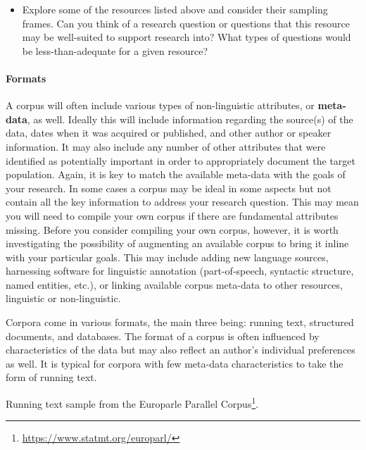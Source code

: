 \documentclass[
]{article}
\DeclareRobustCommand{\href}[2]{#2\footnote{\url{#1}}}
\newenvironment{rmdblock}[1]
  {\begin{shaded*}
  \begin{itemize}
  \renewcommand{\labelitemi}{
    \raisebox{-.5\height}[0pt][0pt]{
      {\setkeys{Gin}{width=2em,keepaspectratio}\texttt{[image: assets/images/\#1]}}
    }
  }
  \item
  }
  {
  \end{itemize}
  \end{shaded*}
  }
\newenvironment{rmdquestion}
  {\begin{rmdblock}{question}}
  {\end{rmdblock}}
\begin{document}
\begin{rmdquestion}
Explore some of the resources listed above and consider their sampling frames. Can you think of a research question or questions that this resource may be well-suited to support research into? What types of questions would be less-than-adequate for a given resource?
\end{rmdquestion}

\hypertarget{formats}{%
\paragraph{Formats}\label{formats}}

A corpus will often include various types of non-linguistic attributes, or \textbf{meta-data}, as well. Ideally this will include information regarding the source(s) of the data, dates when it was acquired or published, and other author or speaker information. It may also include any number of other attributes that were identified as potentially important in order to appropriately document the target population. Again, it is key to match the available meta-data with the goals of your research. In some cases a corpus may be ideal in some aspects but not contain all the key information to address your research question. This may mean you will need to compile your own corpus if there are fundamental attributes missing. Before you consider compiling your own corpus, however, it is worth investigating the possibility of augmenting an available corpus to bring it inline with your particular goals. This may include adding new language sources, harnessing software for linguistic annotation (part-of-speech, syntactic structure, named entities, etc.), or linking available corpus meta-data to other resources, linguistic or non-linguistic.

Corpora come in various formats, the main three being: running text, structured documents, and databases. The format of a corpus is often influenced by characteristics of the data but may also reflect an author's individual preferences as well. It is typical for corpora with few meta-data characteristics to take the form of running text.

Running text sample from the \href{https://www.statmt.org/europarl/}{Europarle Parallel Corpus}.
\end{document}
